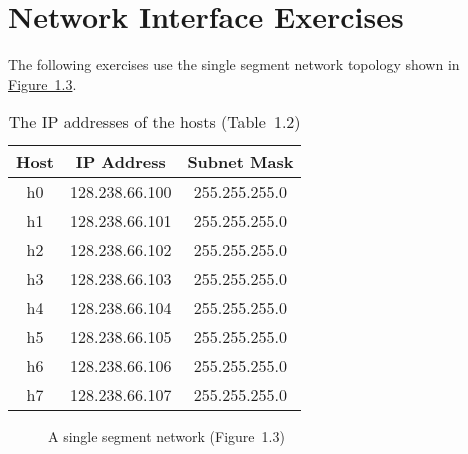 \documentclass{UTNetLab}
\begin{document}
	\part{Network Interface Exercises}
	The following exercises use the single segment network topology shown in \hyperref[fig:1.3]{Figure~1.3}.
	\begin{center}
		\begin{minipage}{0.48\textwidth}
			\begin{flushleft}
				\begin{table}[H]
					\caption{The IP addresses of the hosts (Table~1.2)}
					\centering
					\begin{tabular}{ c c c }
						\hline \hline
						Host & IP Address & Subnet Mask \\
						\hline 
						h0 & 128.238.66.100 & 255.255.255.0 \\
						h1 & 128.238.66.101 & 255.255.255.0 \\
						h2 & 128.238.66.102 & 255.255.255.0 \\
						h3 & 128.238.66.103 & 255.255.255.0 \\
						h4 & 128.238.66.104 & 255.255.255.0 \\
						h5 & 128.238.66.105 & 255.255.255.0 \\
						h6 & 128.238.66.106 & 255.255.255.0 \\
						h7 & 128.238.66.107 & 255.255.255.0 \\
						\hline \hline
					\end{tabular}
				\end{table}
			\end{flushleft}
		\end{minipage}
		\begin{minipage}{0.48\textwidth}
			\begin{flushright}
				\begin{figure}[H]
					\centering
					\caption{A single segment network (Figure~1.3)}\label{fig:1.3}
				\end{figure}
			\end{flushright}
		\end{minipage}
	\end{center}
\end{document}
